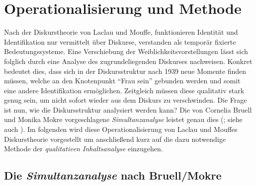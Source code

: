 \documentclass[12pt, titlepage=true, toc=bib]{scrartcl}
\begin{document}
{%

\section{Operationalisierung und Methode}

Nach der Diskurstheorie von Laclau und Mouffe, funktionieren Identität und Identifikation nur vermittelt über Diskurse, verstanden als temporär fixierte Bedeutungssysteme. Eine Verschiebung der Weiblichkeitsvorstellungen lässt sich folglich durch eine Analyse des zugrundeliegenden Diskurses nachweisen. Konkret bedeutet dies, dass sich in der Diskursstruktur nach 1939 neue Momente finden müssen, welche an den Knotenpunkt "`Frau sein"' gebunden werden und somit eine andere Identifikation ermöglichen. Zeitgleich müssen diese qualitativ stark genug sein, um nicht sofort wieder aus dem Diskurs zu verschwinden. Die Frage ist nun, wie die Diskursstruktur analysiert werden kann? Die von Cornelia Bruell und Monika Mokre vorgeschlagene \textit{Simultanzanalyse} leistet genau dies (\cite*{bruell_chancen_2006}; siehe auch \cite{nonhoff_kollektive_2007}). Im folgenden wird diese Operationalisierung von Laclau und Mouffes Diskurstheorie vorgestellt um anschließend kurz auf die dazu notwendige Methode der \textit{qualitativen Inhaltsanalyse} einzugehen.

\subsection{Die \textit{Simultanzanalyse} nach Bruell/Mokre}

}
\end{document}
